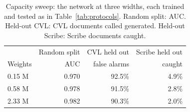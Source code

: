 \begin{table}[t]\centering\caption{Capacity sweep: the network at three widths, each trained and tested as in Table~\ref{tab:protocols}. Random split: AUC. Held-out CVL: CVL documents called generated. Held-out Scribe: Scribe documents caught.}\label{tab:sweep}
\footnotesize\begin{tabular}{@{}lrrr@{}}\toprule
 & Random split & CVL held out & Scribe held out \\
Weights & AUC & false alarms & caught \\\midrule
0.15 M & 0.970 & 92.5\% & 4.9\% \\
0.58 M & 0.978 & 91.5\% & 2.8\% \\
2.33 M & 0.982 & 90.3\% & 2.0\% \\
\bottomrule\end{tabular}\end{table}
